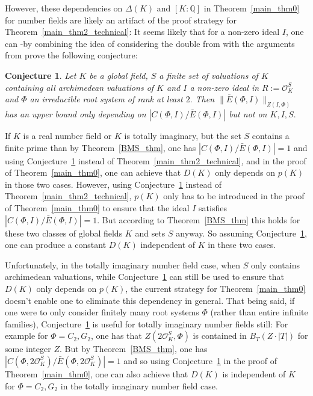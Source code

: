 \documentclass[12pt]{amsart}
\newcommand{\C}[1]{{\mathcal #1}}
\newtheorem{conjecture}[theorem]{Conjecture}
\theoremstyle{definition}\newtheorem{definition}[theorem]{Definition}
\theoremstyle{remark}\newtheorem{remark}[theorem]{Remark}
\theoremstyle{definition}\newtheorem{case}{Case}
\begin{document}
However, these dependencies on $\Delta(K)$ and $[K:\mathbb{Q}]$ in Theorem~\ref{main_thm0} for number fields are likely an artifact of the proof strategy for Theorem~\ref{main_thm2_technical}: It seems likely that for a non-zero ideal $I$, one can -by combining the idea of considering the double from \cite{gvozdevsky2023width} with the arguments from \cite{MR3892969} prove the following conjecture:

\begin{conjecture}\label{foundational_conjecture}
Let $K$ be a global field, $S$ a finite set of valuations of $K$ containing all archimedean valuations of $K$ and $I$ a non-zero ideal in $R:=\C O_K^S$ and $\Phi$ an irreducible root system of rank at least $2.$ Then $\|\bar{E}(\Phi,I)\|_{Z(I,\Phi)}$ has an upper bound only depending on $|C(\Phi,I)/\bar{E}(\Phi,I)|$ but not on $K,I,S.$
\end{conjecture}

If $K$ is a real number field or $K$ is totally imaginary, but the set $S$ contains a finite prime than by Theorem~\ref{BMS_thm}, one has $|C(\Phi,I)/\bar{E}(\Phi,I)|=1$ and using Conjecture~\ref{foundational_conjecture} instead of Theorem~\ref{main_thm2_technical}, \cite[Theorem~3.13]{Chevalley_positive_char_tentative} and \cite[Corollary~3.13]{MR2357719} in the proof of Theorem~\ref{main_thm0}, one can achieve that $D(K)$ only depends on $p(K)$ in those two cases. However, using Conjecture~\ref{foundational_conjecture} instead of Theorem~\ref{main_thm2_technical}, $p(K)$ only has to be introduced in the proof of Theorem~\ref{main_thm0} to ensure that the ideal $I$ satisfies $|C(\Phi,I)/\bar{E}(\Phi,I)|=1.$ But according to Theorem~\ref{BMS_thm} this holds for these two classes of global fields $K$ and sets $S$ anyway. So assuming Conjecture~\ref{foundational_conjecture}, one can produce a constant $D(K)$ independent of $K$ in these two cases.

Unfortunately, in the totally imaginary number field case, when $S$ only contains archimedean valuations, while Conjecture~\ref{foundational_conjecture} can still be used to ensure that $D(K)$ only depends on $p(K)$, the current strategy for Theorem~\ref{main_thm0} doesn't enable one to eliminate this dependency in general. That being said, if one were to only consider finitely many root systems $\Phi$ (rather than entire infinite families), Conjecture~\ref{foundational_conjecture} is useful for totally imaginary number fields still: For example for $\Phi=C_2,G_2$, one has that $Z(2\C O_K^S,\Phi)$ is contained in $B_T(Z\cdot|T|)$ for some integer $Z.$ But by Theorem~\ref{BMS_thm}, one has $|C(\Phi,2\C O_K^S)/\bar{E}(\Phi,2\C O_K^S)|=1$ and so using Conjecture~\ref{foundational_conjecture} in the proof of Theorem~\ref{main_thm0}, one can also achieve that $D(K)$ is independent of $K$ for $\Phi=C_2,G_2$ in the totally imaginary number field case.
\end{document}
